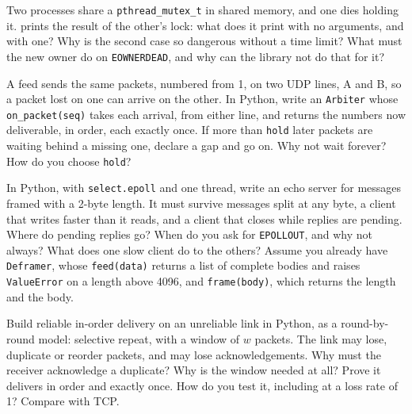 \begin{question}\label{iq:iv3:operating-systems-concurrency-and-networks:36}
Two processes share a \texttt{pthread\_mutex\_t} in shared memory, and one dies holding it.  prints the result of the other's lock: what does it print with no arguments, and with one? Why is the second case so dangerous without a time limit? What must the new owner do on \texttt{EOWNERDEAD}, and why can the library not do that for it?
\label{lst:iv3:os:robust}
\end{question}

\begin{question}\label{iq:iv3:operating-systems-concurrency-and-networks:37}
A feed sends the same packets, numbered from 1, on two UDP lines, A and B, so a packet lost on one can arrive on the other. In Python, write an \texttt{Arbiter} whose \texttt{on\_packet(seq)} takes each arrival, from either line, and returns the numbers now deliverable, in order, each exactly once. If more than \texttt{hold} later packets are waiting behind a missing one, declare a gap and go on. Why not wait forever? How do you choose \texttt{hold}?
\end{question}

\begin{question}\label{iq:iv3:operating-systems-concurrency-and-networks:38}
In Python, with \texttt{select.epoll} and one thread, write an echo server for messages framed with a 2-byte length. It must survive messages split at any byte, a client that writes faster than it reads, and a client that closes while replies are pending. Where do pending replies go? When do you ask for \texttt{EPOLLOUT}, and why not always? What does one slow client do to the others? Assume you already have \texttt{Deframer}, whose \texttt{feed(data)} returns a list of complete bodies and raises \texttt{ValueError} on a length above 4096, and \texttt{frame(body)}, which returns the length and the body.
\end{question}

\begin{question}\label{iq:iv3:operating-systems-concurrency-and-networks:39}
Build reliable in-order delivery on an unreliable link in Python, as a round-by-round model: selective repeat, with a window of $w$ packets. The link may lose, duplicate or reorder packets, and may lose acknowledgements. Why must the receiver acknowledge a duplicate? Why is the window needed at all? Prove it delivers in order and exactly once. How do you test it, including at a loss rate of 1? Compare with TCP.
\end{question}

